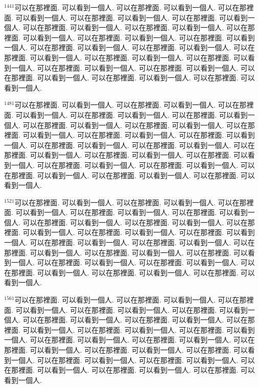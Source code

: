 \documentclass{book}
\begin{document}
$^{1441}$可以在那裡面.
可以看到一個人.
可以在那裡面.
可以看到一個人.
可以在那裡面.
可以看到一個人.
可以在那裡面.
可以看到一個人.
可以在那裡面.
可以看到一個人.
可以在那裡面.
可以看到一個人.
可以在那裡面.
可以看到一個人.
可以在那裡面.
可以看到一個人.
可以在那裡面.
可以看到一個人.
可以在那裡面.
可以看到一個人.
可以在那裡面.
可以看到一個人.
可以在那裡面.
可以看到一個人.
可以在那裡面.
可以看到一個人.
可以在那裡面.
可以看到一個人.
可以在那裡面.
可以看到一個人.
可以在那裡面.
可以看到一個人.
可以在那裡面.
可以看到一個人.
可以在那裡面.
可以看到一個人.
可以在那裡面.
可以看到一個人.
可以在那裡面.
可以看到一個人.

$^{1481}$可以在那裡面.
可以看到一個人.
可以在那裡面.
可以看到一個人.
可以在那裡面.
可以看到一個人.
可以在那裡面.
可以看到一個人.
可以在那裡面.
可以看到一個人.
可以在那裡面.
可以看到一個人.
可以在那裡面.
可以看到一個人.
可以在那裡面.
可以看到一個人.
可以在那裡面.
可以看到一個人.
可以在那裡面.
可以看到一個人.
可以在那裡面.
可以看到一個人.
可以在那裡面.
可以看到一個人.
可以在那裡面.
可以看到一個人.
可以在那裡面.
可以看到一個人.
可以在那裡面.
可以看到一個人.
可以在那裡面.
可以看到一個人.
可以在那裡面.
可以看到一個人.
可以在那裡面.
可以看到一個人.
可以在那裡面.
可以看到一個人.
可以在那裡面.
可以看到一個人.

$^{1521}$可以在那裡面.
可以看到一個人.
可以在那裡面.
可以看到一個人.
可以在那裡面.
可以看到一個人.
可以在那裡面.
可以看到一個人.
可以在那裡面.
可以看到一個人.
可以在那裡面.
可以看到一個人.
可以在那裡面.
可以看到一個人.
可以在那裡面.
可以看到一個人.
可以在那裡面.
可以看到一個人.
可以在那裡面.
可以看到一個人.
可以在那裡面.
可以看到一個人.
可以在那裡面.
可以看到一個人.
可以在那裡面.
可以看到一個人.
可以在那裡面.
可以看到一個人.
可以在那裡面.
可以看到一個人.
可以在那裡面.
可以看到一個人.
可以在那裡面.
可以看到一個人.
可以在那裡面.
可以看到一個人.
可以在那裡面.
可以看到一個人.
可以在那裡面.
可以看到一個人.

$^{1561}$可以在那裡面.
可以看到一個人.
可以在那裡面.
可以看到一個人.
可以在那裡面.
可以看到一個人.
可以在那裡面.
可以看到一個人.
可以在那裡面.
可以看到一個人.
可以在那裡面.
可以看到一個人.
可以在那裡面.
可以看到一個人.
可以在那裡面.
可以看到一個人.
可以在那裡面.
可以看到一個人.
可以在那裡面.
可以看到一個人.
可以在那裡面.
可以看到一個人.
可以在那裡面.
可以看到一個人.
可以在那裡面.
可以看到一個人.
可以在那裡面.
可以看到一個人.
可以在那裡面.
可以看到一個人.
可以在那裡面.
可以看到一個人.
可以在那裡面.
可以看到一個人.
可以在那裡面.
可以看到一個人.
可以在那裡面.
可以看到一個人.
可以在那裡面.
可以看到一個人.
\end{document}
